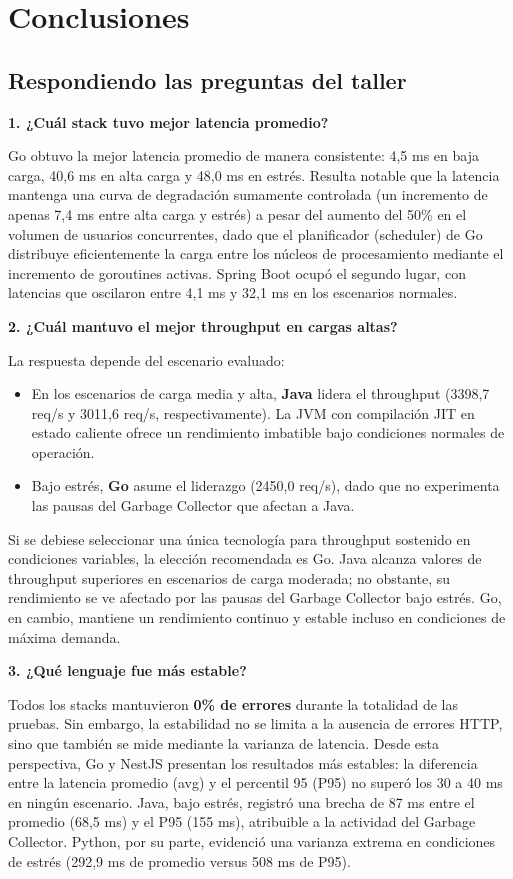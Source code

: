 \documentclass[12pt,a4paper]{article}
\begin{document}
\section{Conclusiones}

\subsection{Respondiendo las preguntas del taller}

\textbf{1. ¿Cuál stack tuvo mejor latencia promedio?}

Go obtuvo la mejor latencia promedio de manera consistente: 4,5 ms en baja carga, 40,6 ms en alta carga y 48,0 ms en estrés. Resulta notable que la latencia mantenga una curva de degradación sumamente controlada (un incremento de apenas 7,4 ms entre alta carga y estrés) a pesar del aumento del 50\% en el volumen de usuarios concurrentes, dado que el planificador (scheduler) de Go distribuye eficientemente la carga entre los núcleos de procesamiento mediante el incremento de goroutines activas. Spring Boot ocupó el segundo lugar, con latencias que oscilaron entre 4,1 ms y 32,1 ms en los escenarios normales.

\textbf{2. ¿Cuál mantuvo el mejor throughput en cargas altas?}

La respuesta depende del escenario evaluado:
\begin{itemize}
    \item En los escenarios de carga media y alta, \textbf{Java} lidera el throughput (3398,7 req/s y 3011,6 req/s, respectivamente). La JVM con compilación JIT en estado caliente ofrece un rendimiento imbatible bajo condiciones normales de operación.
    \item Bajo estrés, \textbf{Go} asume el liderazgo (2450,0 req/s), dado que no experimenta las pausas del Garbage Collector que afectan a Java.
\end{itemize}
Si se debiese seleccionar una única tecnología para throughput sostenido en condiciones variables, la elección recomendada es Go. Java alcanza valores de throughput superiores en escenarios de carga moderada; no obstante, su rendimiento se ve afectado por las pausas del Garbage Collector bajo estrés. Go, en cambio, mantiene un rendimiento continuo y estable incluso en condiciones de máxima demanda.

\textbf{3. ¿Qué lenguaje fue más estable?}

Todos los stacks mantuvieron \textbf{0\% de errores} durante la totalidad de las pruebas. Sin embargo, la estabilidad no se limita a la ausencia de errores HTTP, sino que también se mide mediante la varianza de latencia. Desde esta perspectiva, Go y NestJS presentan los resultados más estables: la diferencia entre la latencia promedio (avg) y el percentil 95 (P95) no superó los 30 a 40 ms en ningún escenario. Java, bajo estrés, registró una brecha de 87 ms entre el promedio (68,5 ms) y el P95 (155 ms), atribuible a la actividad del Garbage Collector. Python, por su parte, evidenció una varianza extrema en condiciones de estrés (292,9 ms de promedio versus 508 ms de P95).
\end{document}

